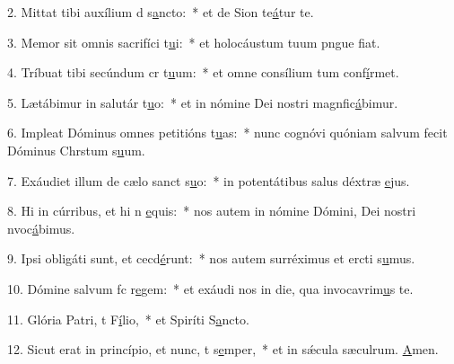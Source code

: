 2. Mittat tibi auxílium d s\uline{a}ncto:~* et de Sion te\uline{á}tur te.\par 
3. Memor sit omnis sacrifíci t\uline{u}i:~* et holocáustum tuum pngue f\uline{i}at.\par 
4. Tríbuat tibi secúndum cr t\uline{u}um:~* et omne consílium tum conf\uline{í}rmet.\par 
5. Lætábimur in salutár t\uline{u}o:~* et in nómine Dei nostri magnfic\uline{á}bimur.\par 
6. Impleat Dóminus omnes petitións t\uline{u}as:~* nunc cognóvi quóniam salvum fecit Dóminus Chrstum s\uline{u}um.\par 
7. Exáudiet illum de cælo sanct s\uline{u}o:~* in potentátibus salus déxtræ \uline{e}jus.\par 
8. Hi in cúrribus, et hi n \uline{e}quis:~* nos autem in nómine Dómini, Dei nostri nvoc\uline{á}bimus.\par 
9. Ipsi obligáti sunt, et cecd\uline{é}runt:~* nos autem surréximus et ercti s\uline{u}mus.\par 
10. Dómine salvum fc r\uline{e}gem:~* et exáudi nos in die, qua invocavrim\uline{u}s te.\par 
11. Glória Patri, t F\uline{í}lio,~* et Spiríti S\uline{a}ncto.\par 
12. Sicut erat in princípio, et nunc, t s\uline{e}mper,~* et in sǽcula sæculrum. \uline{A}men.\par 
